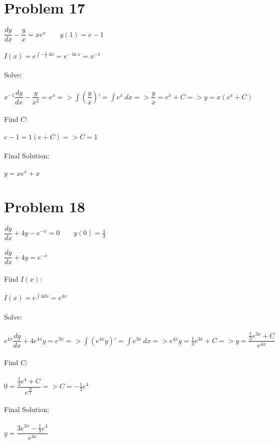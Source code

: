 \documentclass[12pt]{exam}
\begin{document}
\section*{Problem 17}
$\dfrac{dy}{dx}-\dfrac{y}{x}=xe^x\qquad y(1)=e-1$\\\\
$I(x)=e^{\int-\frac{1}{x}\:dx}=e^{-\ln{x}}=x^{-1}$\\\\
Solve:\\\\
$x^{-1}\dfrac{dy}{dx}-\dfrac{y}{x^2}=e^x=>\int\left(\dfrac{y}{x}\right)'=\int e^x\:dx=>\dfrac{y}{x}=e^x+C=>y=x(e^x+C)$\\\\
Find $C$:\\\\
$e-1=1(e+C)=>C=1$\\\\
Final Solution:\\\\
$y=xe^x+x$
\section*{Problem 18}
$\dfrac{dy}{dx}+4y-e^{-x}=0\qquad y(0)=\frac{4}{3}$\\\\
$\dfrac{dy}{dx}+4y=e^{-x}$\\\\
Find $I(x)$:\\\\
$I(x)=e^{\int 4dx}=e^{4x}$\\\\
Solve:\\\\
$e^{4x}\dfrac{dy}{dx}+4e^{4x}y=e^{3x}=>\int(e^{4x}y)'=\int e^{3x}\:dx=>e^{4x}y=\frac{1}{3}e^{3x}+C=>y=\dfrac{\frac{1}{3}e^{3x}+C}{e^{4x}}$\\\\
Find $C$:\\\\
$0=\dfrac{\frac{1}{3}e^4+C}{e^{\frac{16}{3}}}=>C=-\frac{1}{3}e^4$\\\\
Final Solution:\\\\
$y=\dfrac{3e^{3x}-\frac{1}{3}e^4}{e^{4x}}$
\end{document}
